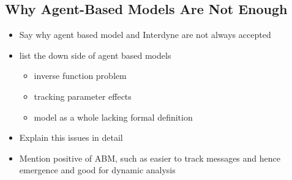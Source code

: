 \documentclass{article}
\begin{document}
\subsection{Why Agent-Based Models Are Not Enough} \label{Iinterdynenotenough}

\begin{itemize}
  \item Say why agent based model and Interdyne are not always accepted
  \item list the down side of agent based models \begin{itemize}
  \item inverse function problem
  \item tracking parameter effects
  \item model as a whole lacking formal definition 
\end{itemize}
  \item Explain this issues in detail 
  \item Mention positive of ABM, such as easier to track messages and hence emergence and good for dynamic analysis 
\end{itemize}
\end{document}

